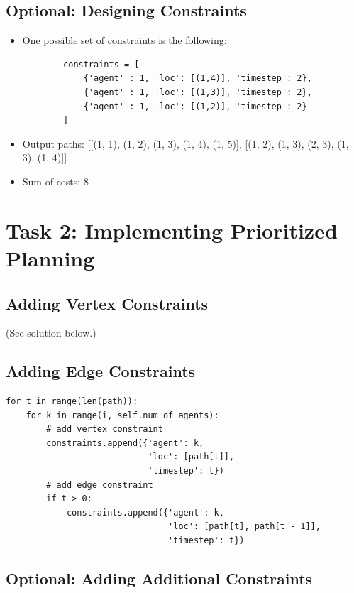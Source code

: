 \documentclass[11pt]{article}
\begin{document}
\subsection{Optional: Designing Constraints}

\begin{itemize}
    \item One possible set of constraints is the following:
\begin{verbatim}
        constraints = [
            {'agent' : 1, 'loc': [(1,4)], 'timestep': 2},
            {'agent' : 1, 'loc': [(1,3)], 'timestep': 2},
            {'agent' : 1, 'loc': [(1,2)], 'timestep': 2}
        ]
\end{verbatim}
    \item Output paths: [[(1, 1), (1, 2), (1, 3), (1, 4), (1, 5)], [(1, 2), (1, 3), (2, 3), (1, 3), (1, 4)]]
    \item Sum of costs: 8
\end{itemize}

\section{Task 2: Implementing Prioritized Planning}

\subsection{Adding Vertex Constraints}

(See solution below.)

\subsection{Adding Edge Constraints}

\begin{verbatim}
for t in range(len(path)):
    for k in range(i, self.num_of_agents):
        # add vertex constraint
        constraints.append({'agent': k,
                            'loc': [path[t]],
                            'timestep': t})
        # add edge constraint
        if t > 0:
            constraints.append({'agent': k,
                                'loc': [path[t], path[t - 1]],
                                'timestep': t})
\end{verbatim}

\subsection{Optional: Adding Additional Constraints}
\end{document}
